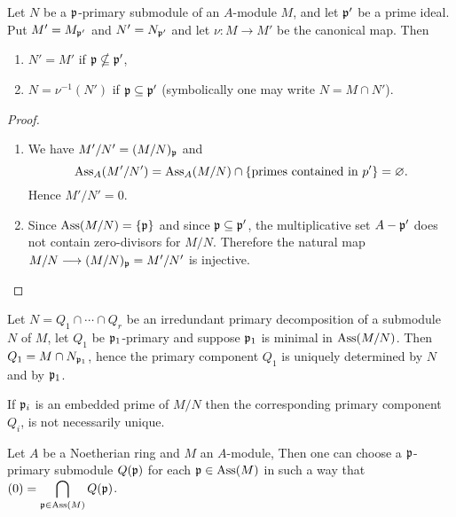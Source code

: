 \documentclass[../main]{subfiles}
\begin{document}
\begin{parproposition}\label{pro:08.02}
Let $N$ be a $\mathfrak{p}$-primary submodule of an $A$-module $M$, and let $\mathfrak{p}'$ be a prime ideal. Put $M' = M_{\mathfrak{p}'}$ and $N' = N_{\mathfrak{p}'}$ and let $\nu:M\longrightarrow M'$ be the canonical map. Then
\begin{enumerate}
    \item $N'=M'$ if $\mathfrak{p}\nsubseteq\mathfrak{p}'$,
    \item $N=\nu^{-1}(N')$ if $\mathfrak{p}\subseteq\mathfrak{p}'$ (symbolically one may write $N=M\cap N'$).
\end{enumerate}
\end{parproposition}

\begin{proof}
\begin{enumerate}
    \item We have $M'/N' = (M/N)_{\mathfrak{p}}$ and \[\operatorname{Ass}_A(M'/N') =\operatorname{Ass}_A(M/N)\cap\{\text{primes contained in }p'\}=\varnothing.\] Hence $M'/N' = 0$.
    \item Since $\operatorname{Ass}(M/N) = \{\mathfrak{p}\}$ and since $\mathfrak{p}\subseteq\mathfrak{p}'$, the multiplicative set $A-\mathfrak{p}'$ does not contain zero-divisors for $M/N$. Therefore the natural map $M/N\longrightarrow(M/N)_{\mathfrak{p}} = M'/N'$ is injective.
\end{enumerate}
\end{proof}

\begin{corollary}\label{cor:08.01}
Let $N = Q_1\cap\cdots\cap Q_r$ be an irredundant primary decomposition of a submodule $N$ of $M$, let $Q_1$ be $\mathfrak{p}_1$-primary and suppose $\mathfrak{p}_1$ is minimal in $\operatorname{Ass}(M/N)$. Then $Q_1=M\cap N_{\mathfrak{p}_1}$, hence the primary component $Q_1$ is uniquely determined by $N$ and by $\mathfrak{p}_1$.
\end{corollary}

\begin{remark}
If $\mathfrak{p}_i$ is an embedded prime of $M/N$ then the corresponding primary component $Q_i$, is not necessarily unique.
\end{remark}

\begin{partheorem}\label{thm:011}
Let $A$ be a Noetherian ring and $M$ an $A$-module, Then one can choose a $\mathfrak{p}$-primary submodule $Q(\mathfrak{p})$ for each $\mathfrak{p}\in\operatorname{Ass}(M)$ in such a way that $(0) =\displaystyle \bigcap_{\mathfrak{p}\in\operatorname{Ass}(M)}Q(\mathfrak{p})$.
\end{partheorem}
\end{document}
